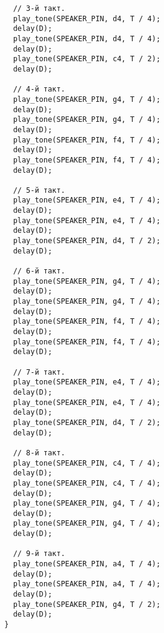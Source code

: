 \documentclass[../sparc.tex]{subfiles}
\begin{document}
\begin{verbatim}
    // 3-й такт.
    play_tone(SPEAKER_PIN, d4, T / 4);
    delay(D);
    play_tone(SPEAKER_PIN, d4, T / 4);
    delay(D);
    play_tone(SPEAKER_PIN, c4, T / 2);
    delay(D);

    // 4-й такт.
    play_tone(SPEAKER_PIN, g4, T / 4);
    delay(D);
    play_tone(SPEAKER_PIN, g4, T / 4);
    delay(D);
    play_tone(SPEAKER_PIN, f4, T / 4);
    delay(D);
    play_tone(SPEAKER_PIN, f4, T / 4);
    delay(D);

    // 5-й такт.
    play_tone(SPEAKER_PIN, e4, T / 4);
    delay(D);
    play_tone(SPEAKER_PIN, e4, T / 4);
    delay(D);
    play_tone(SPEAKER_PIN, d4, T / 2);
    delay(D);

    // 6-й такт.
    play_tone(SPEAKER_PIN, g4, T / 4);
    delay(D);
    play_tone(SPEAKER_PIN, g4, T / 4);
    delay(D);
    play_tone(SPEAKER_PIN, f4, T / 4);
    delay(D);
    play_tone(SPEAKER_PIN, f4, T / 4);
    delay(D);

    // 7-й такт.
    play_tone(SPEAKER_PIN, e4, T / 4);
    delay(D);
    play_tone(SPEAKER_PIN, e4, T / 4);
    delay(D);
    play_tone(SPEAKER_PIN, d4, T / 2);
    delay(D);

    // 8-й такт.
    play_tone(SPEAKER_PIN, c4, T / 4);
    delay(D);
    play_tone(SPEAKER_PIN, c4, T / 4);
    delay(D);
    play_tone(SPEAKER_PIN, g4, T / 4);
    delay(D);
    play_tone(SPEAKER_PIN, g4, T / 4);
    delay(D);

    // 9-й такт.
    play_tone(SPEAKER_PIN, a4, T / 4);
    delay(D);
    play_tone(SPEAKER_PIN, a4, T / 4);
    delay(D);
    play_tone(SPEAKER_PIN, g4, T / 2);
    delay(D);
  }
\end{verbatim}
\end{document}
